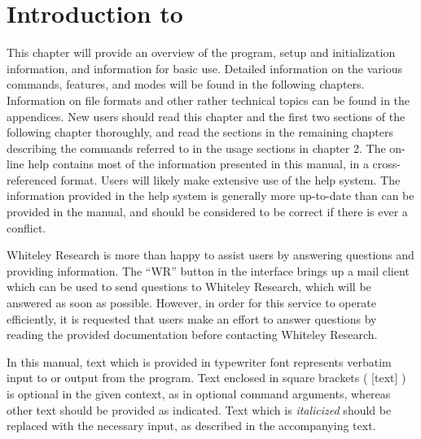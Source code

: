 
\chapter{Introduction to {\Xic}}

This chapter will provide an overview of the {\Xic} program, setup and
initialization information, and information for basic use.  Detailed
information on the various commands, features, and modes will be found
in the following chapters.  Information on file formats and other
rather technical topics can be found in the appendices.  New users
should read this chapter and the first two sections of the following
chapter thoroughly, and read the sections in the remaining chapters
describing the commands referred to in the usage sections in chapter
2.  The on-line help contains most of the information presented in
this manual, in a cross-referenced format.  Users will likely make
extensive use of the help system.  The information provided in the
help system is generally more up-to-date than can be provided in the
manual, and should be considered to be correct if there is ever a
conflict.

Whiteley Research is more than happy to assist users by answering
questions and providing information.  The ``{\cb WR}'' button in the
{\Xic} interface brings up a mail client which can be used to send
questions to Whiteley Research, which will be answered as soon as
possible.  However, in order for this service to operate efficiently,
it is requested that users make an effort to answer questions by
reading the provided documentation before contacting Whiteley
Research.

In this manual, text which is provided in {\vt typewriter} font
represents verbatim input to or output from the program.  Text
enclosed in square brackets ( [text] ) is optional in the given
context, as in optional command arguments, whereas other text should
be provided as indicated.  Text which is {\it italicized\/} should be
replaced with the necessary input, as described in the accompanying
text.

